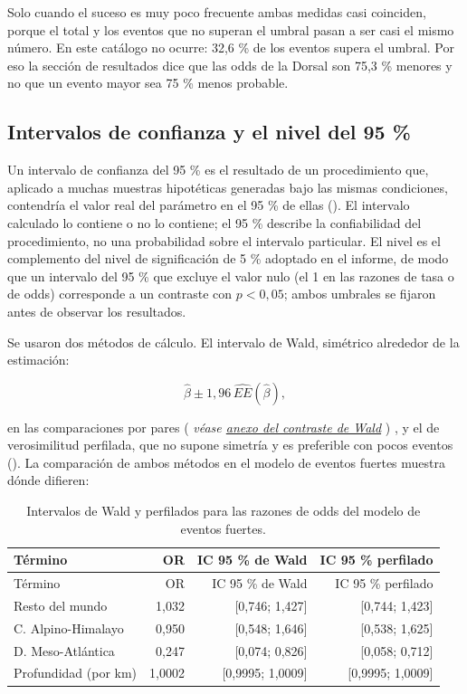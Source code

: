 \documentclass[
  spanish,
  letterpaper,
  DIV=11,
  numbers=noendperiod]{scrartcl}
\newcommand{\asesoriaParenRef}[1]{%
  \textnormal{\textcolor{asesoriaTextColor}{(}}%
  {\hypersetup{linkcolor=asesoriaLinkColor,urlcolor=asesoriaLinkColor,citecolor=asesoriaLinkColor}\textcolor{asesoriaTextColor}{\emph{#1}}}%
  \textnormal{\textcolor{asesoriaTextColor}{)}}%
}
\begin{document}
Solo cuando el suceso es muy poco frecuente ambas medidas casi
coinciden, porque el total y los eventos que no superan el umbral pasan
a ser casi el mismo número. En este catálogo no ocurre: 32,6 \% de los
eventos supera el umbral. Por eso la sección de resultados dice que las
odds de la Dorsal son 75,3 \% menores y no que un evento mayor sea 75 \%
menos probable.

\subsection{Intervalos de confianza y el nivel del 95
\%}\label{sec-anexo-ic}

Un intervalo de confianza del 95 \% es el resultado de un procedimiento
que, aplicado a muchas muestras hipotéticas generadas bajo las mismas
condiciones, contendría el valor real del parámetro en el 95 \% de ellas
(). El intervalo calculado lo
contiene o no lo contiene; el 95 \% describe la confiabilidad del
procedimiento, no una probabilidad sobre el intervalo particular. El
nivel es el complemento del nivel de significación de 5 \% adoptado en
el informe, de modo que un intervalo del 95 \% que excluye el valor nulo
(el 1 en las razones de tasa o de odds) corresponde a un contraste con
\(p<0{,}05\); ambos umbrales se fijaron antes de observar los
resultados.

Se usaron dos métodos de cálculo. El intervalo de Wald, simétrico
alrededor de la estimación:

\[
\hat\beta \pm 1{,}96\,\widehat{EE}(\hat\beta),
\]

en las comparaciones por pares
\asesoriaParenRef{véase \hyperref[sec-anexo-wald]{anexo del contraste de Wald}},
y el de verosimilitud perfilada, que no supone simetría y es preferible
con pocos eventos (). La comparación de ambos métodos en el modelo de eventos fuertes
muestra dónde difieren:

\begin{longtable}[]{@{}lrrr@{}}
\caption{Intervalos de Wald y perfilados para las razones de odds del
modelo de eventos fuertes.}\label{tbl-ic-comparacion}\tabularnewline
\toprule\noalign{}
Término & OR & IC 95 \% de Wald & IC 95 \% perfilado \\
\midrule\noalign{}
\endfirsthead
\toprule\noalign{}
Término & OR & IC 95 \% de Wald & IC 95 \% perfilado \\
\midrule\noalign{}
\endhead
\bottomrule\noalign{}
\endlastfoot
Resto del mundo & 1,032 & {[}0,746; 1,427{]} & {[}0,744; 1,423{]} \\
C. Alpino-Himalayo & 0,950 & {[}0,548; 1,646{]} & {[}0,538; 1,625{]} \\
D. Meso-Atlántica & 0,247 & {[}0,074; 0,826{]} & {[}0,058; 0,712{]} \\
Profundidad (por km) & 1,0002 & {[}0,9995; 1,0009{]} & {[}0,9995;
1,0009{]} \\
\end{longtable}
\end{document}

